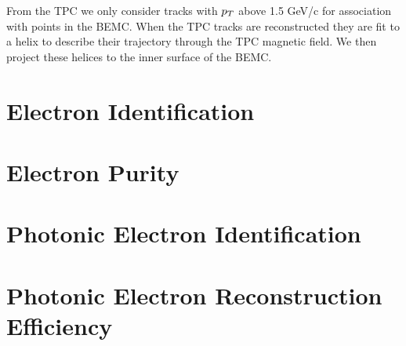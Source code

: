 From the TPC we only consider tracks with $p_{T}$ above 1.5 GeV/c for association with points in the BEMC. When the TPC tracks are reconstructed they are fit to a helix to describe their trajectory through the TPC magnetic field. We then project these helices to the inner surface of the BEMC.

 

\section{Electron Identification}

\section{Electron Purity}

\section{Photonic Electron Identification}

\section{Photonic Electron Reconstruction Efficiency}
